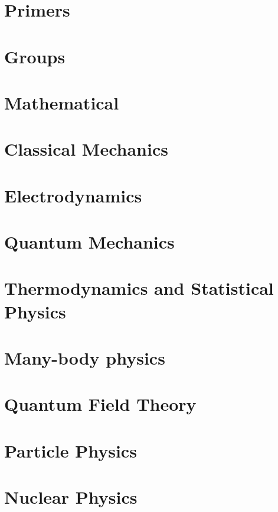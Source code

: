 \documentclass[10pt,a4paper]{book}
\theoremstyle{definition}
\begin{document}
\newpage
\chapter{Primers}


\chapter{Groups}


\newpage
\chapter{Mathematical}


\chapter{Classical Mechanics}


\chapter{Electrodynamics}


\chapter{Quantum Mechanics}


\chapter{Thermodynamics and Statistical Physics}


\chapter{Many-body physics}


\chapter{Quantum Field Theory}


\chapter{Particle Physics}


\chapter{Nuclear Physics}

\end{document}

